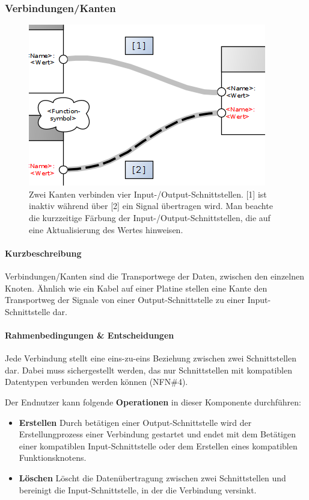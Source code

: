 \subsubsection{Verbindungen/Kanten}
\begin{figure}[h]
  \centering
  \includegraphics[width=.55\textwidth]{bilder/chapter4/chapter4_3/links.png}
  \caption{Zwei Kanten verbinden vier Input-/Output-Schnittstellen. [1] ist inaktiv während über [2] ein Signal übertragen wird. Man beachte die kurzzeitige Färbung der Input-/Output-Schnittstellen, die auf eine Aktualisierung des Wertes hinweisen.}
  \label{fig:genericlink}
\end{figure}


\paragraph{Kurzbeschreibung} Verbindungen/Kanten sind die Transportwege der Daten, zwischen den einzelnen Knoten. Ähnlich wie ein Kabel auf einer Platine stellen eine Kante den Transportweg der Signale von einer Output-Schnittstelle zu einer Input-Schnittstelle dar.

\paragraph{Rahmenbedingungen \& Entscheidungen} Jede Verbindung stellt eine eins-zu-eins Beziehung zwischen zwei Schnittstellen dar. Dabei muss sichergestellt werden, das nur Schnittstellen mit kompatiblen Datentypen verbunden werden können (NFN\#4). 

Der Endnutzer kann folgende \textbf{Operationen} in dieser Komponente durchführen: 
\begin{itemize}
    \item \textbf{Erstellen} Durch betätigen einer Output-Schnittstelle wird der Erstellungprozess einer Verbindung gestartet und endet mit dem Betätigen einer kompatiblen Input-Schnittstelle oder dem Erstellen eines kompatiblen Funktionsknotens.
    \item \textbf{Löschen} Löscht die Datenübertragung zwischen zwei Schnittstellen und bereinigt die Input-Schnittstelle, in der die Verbindung versinkt.
\end{itemize}

